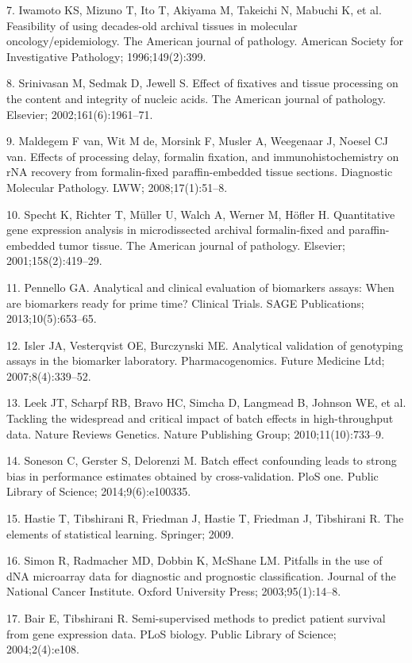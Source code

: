 \documentclass[11pt]{article}
\begin{document}
7. Iwamoto KS, Mizuno T, Ito T, Akiyama M, Takeichi N, Mabuchi K, et al.
Feasibility of using decades-old archival tissues in molecular
oncology/epidemiology. The American journal of pathology. American
Society for Investigative Pathology; 1996;149(2):399.

8. Srinivasan M, Sedmak D, Jewell S. Effect of fixatives and tissue
processing on the content and integrity of nucleic acids. The American
journal of pathology. Elsevier; 2002;161(6):1961--71.

9. Maldegem F van, Wit M de, Morsink F, Musler A, Weegenaar J, Noesel CJ
van. Effects of processing delay, formalin fixation, and
immunohistochemistry on rNA recovery from formalin-fixed
paraffin-embedded tissue sections. Diagnostic Molecular Pathology. LWW;
2008;17(1):51--8.

10. Specht K, Richter T, M{ü}ller U, Walch A, Werner M, H{ö}fler H.
Quantitative gene expression analysis in microdissected archival
formalin-fixed and paraffin-embedded tumor tissue. The American journal
of pathology. Elsevier; 2001;158(2):419--29.

11. Pennello GA. Analytical and clinical evaluation of biomarkers
assays: When are biomarkers ready for prime time? Clinical Trials. SAGE
Publications; 2013;10(5):653--65.

12. Isler JA, Vesterqvist OE, Burczynski ME. Analytical validation of
genotyping assays in the biomarker laboratory. Pharmacogenomics. Future
Medicine Ltd; 2007;8(4):339--52.

13. Leek JT, Scharpf RB, Bravo HC, Simcha D, Langmead B, Johnson WE, et
al. Tackling the widespread and critical impact of batch effects in
high-throughput data. Nature Reviews Genetics. Nature Publishing Group;
2010;11(10):733--9.

14. Soneson C, Gerster S, Delorenzi M. Batch effect confounding leads to
strong bias in performance estimates obtained by cross-validation. PloS
one. Public Library of Science; 2014;9(6):e100335.

15. Hastie T, Tibshirani R, Friedman J, Hastie T, Friedman J, Tibshirani
R. The elements of statistical learning. Springer; 2009.

16. Simon R, Radmacher MD, Dobbin K, McShane LM. Pitfalls in the use of
dNA microarray data for diagnostic and prognostic classification.
Journal of the National Cancer Institute. Oxford University Press;
2003;95(1):14--8.

17. Bair E, Tibshirani R. Semi-supervised methods to predict patient
survival from gene expression data. PLoS biology. Public Library of
Science; 2004;2(4):e108.
\end{document}
